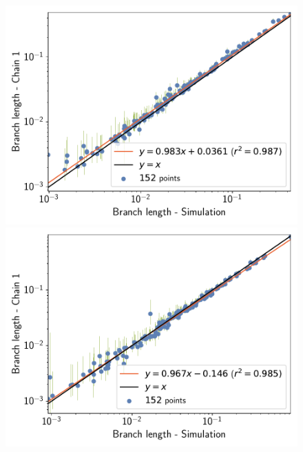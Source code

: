 \documentclass{article}
\providecommand{\DIFaddbeginFL}{} %
\providecommand{\DIFaddendFL}{} %
\providecommand{\DIFdelbeginFL}{} %
\providecommand{\DIFdelendFL}{} %
\begin{document}
\begin{figure}[t]
\begin{minipage}{0.32\linewidth}
            \includegraphics[width=\linewidth, page=1]{simulations/SimuPoly_SiteMutSelBranchNe_BranchCorrelation_Log10BranchLength}
        \end{minipage}
        \DIFdelbeginFL %
\DIFdelendFL \DIFaddbeginFL {}\DIFaddendFL \hfill
        \begin{minipage}{0.32\linewidth}
            \includegraphics[width=\linewidth, page=1]{simulations/SimuFold_SiteMutSelBranchNe_BranchCorrelation_Log10BranchLength}
        \end{minipage}

\end{figure}
\end{document}
